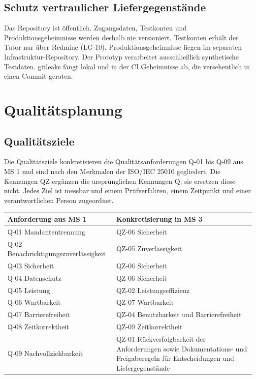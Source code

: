 \documentclass[11pt,a4paper]{article}
\begin{document}
\subsection{Schutz vertraulicher Liefergegenstände}

Das Repository ist öffentlich. Zugangsdaten, Testkonten und Produktionsgeheimnisse werden deshalb nie versioniert. Testkonten erhält der Tutor nur über Redmine (LG-10), Produktionsgeheimnisse liegen im separaten Infrastruktur-Repository. Der Prototyp verarbeitet ausschließlich synthetische Testdaten. gitleaks fängt lokal und in der CI Geheimnisse ab, die versehentlich in einen Commit geraten.

\section{Qualitätsplanung}

\subsection{Qualitätsziele}

Die Qualitätsziele konkretisieren die Qualitätsanforderungen Q-01 bis Q-09 aus MS 1 und sind nach den Merkmalen der ISO/IEC 25010 gegliedert. Die Kennungen QZ ergänzen die ursprünglichen Kennungen Q; sie ersetzen diese nicht. Jedes Ziel ist messbar und einem Prüfverfahren, einem Zeitpunkt und einer verantwortlichen Person zugeordnet.

\begin{tabularx}{\linewidth}{@{}>{\hsize=0.89\hsize\RaggedRight\arraybackslash}X >{\hsize=1.11\hsize\RaggedRight\arraybackslash}X@{}}
\toprule
\textbf{Anforderung aus MS 1} & \textbf{Konkretisierung in MS 3} \\
\midrule
\endhead
Q-01 Mandantentrennung & QZ-06 Sicherheit \\
Q-02 Benachrichtigungszuverlässigkeit & QZ-05 Zuverlässigkeit \\
Q-03 Sicherheit & QZ-06 Sicherheit \\
Q-04 Datenschutz & QZ-06 Sicherheit \\
Q-05 Leistung & QZ-02 Leistungseffizienz \\
Q-06 Wartbarkeit & QZ-07 Wartbarkeit \\
Q-07 Barrierefreiheit & QZ-04 Benutzbarkeit und Barrierefreiheit \\
Q-08 Zeitkorrektheit & QZ-09 Zeitkorrektheit \\
Q-09 Nachvollziehbarkeit & QZ-01 Rückverfolgbarkeit der Anforderungen sowie Dokumentations- und Freigaberegeln für Entscheidungen und Liefergegenstände \\
\bottomrule
\end{tabularx}
\end{document}
